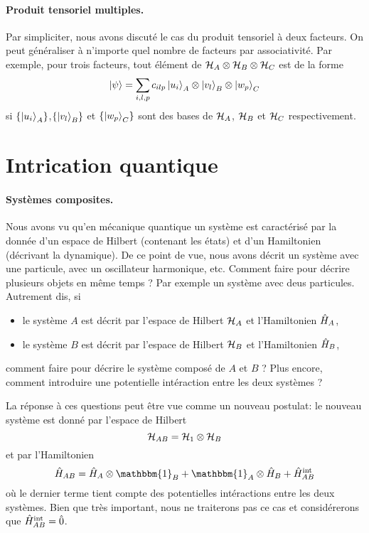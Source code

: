 \documentclass[11pt,a4paper,oneside]{article}
\begin{document}
\paragraph*{Produit tensoriel multiples.} Par simpliciter, nous avons discuté le cas du produit tensoriel à deux facteurs. On peut généraliser à n'importe quel nombre de facteurs par associativité. Par exemple, pour trois facteurs, tout élément de $\mathcal{H}_A\otimes\mathcal{H}_B\otimes\mathcal{H}_C$ est de la forme
\begin{eqnarray}
    \ket{\psi}=\sum_{i,l,p} c_{ilp} \ket{u_i}_A\otimes\ket{v_l}_B\otimes\ket{w_p}_C
\end{eqnarray}
si $\{\ket{u_i}_A\}$,$\{\ket{v_l}_B\}$ et $\{\ket{w_p}_C\}$ sont des bases de $\mathcal{H}_A$, $\mathcal{H}_B$ et $\mathcal{H}_C$ respectivement.

\section{Intrication quantique}

\paragraph*{Systèmes composites.} Nous avons vu qu'en mécanique quantique un système est caractérisé par la donnée d'un espace de Hilbert (contenant les états) et d'un Hamiltonien (décrivant la dynamique). De ce point de vue, nous avons décrit un système avec une particule, avec un oscillateur harmonique, etc. Comment faire pour décrire plusieurs objets en même temps ? Par exemple un système avec deus particules. Autrement dis, si
\begin{itemize}
    \item le système $A$ est décrit par l'espace de Hilbert $\mathcal{H}_A$ et l'Hamiltonien $\hat{H}_A$,
    \item le système $B$ est décrit par l'espace de Hilbert $\mathcal{H}_B$ et l'Hamiltonien $\hat{H}_B$,
\end{itemize}
comment faire pour décrire le système composé de $A$ et $B$ ? Plus encore, comment introduire une potentielle intéraction entre les deux systèmes ? 

La réponse à ces questions peut être vue comme un nouveau postulat: le nouveau système est donné par l'espace de Hilbert
\begin{equation}
    \mathcal{H}_{AB} = \mathcal{H}_1\otimes\mathcal{H}_B
\end{equation}
et par l'Hamiltonien
\begin{equation}
    \hH_{AB} = \hH_A\otimes\mathbbm{1}_B+\mathbbm{1}_A\otimes\hH_B+\hH^{\text{int}}_{AB}
\end{equation}
où le dernier terme tient compte des potentielles intéractions entre les deux systèmes. Bien que très important, nous ne traiterons pas ce cas et considérerons que $\hat{H}^{\text{int}}_{AB}=\hat{0}$. \\
\end{document}
